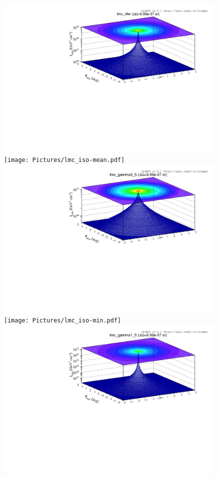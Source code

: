 \documentclass[main.tex]{subfiles}
\begin{document}
\begin{figure}
\centering
{}
\includegraphics[width=1\textwidth]{Pictures/lmc_nfw.pdf}
\endminipage 
{}
\texttt{[image: Pictures/lmc\_iso-mean.pdf]}
\endminipage \\
\includegraphics[width=1\textwidth]{Pictures/lmc_gamma0-5.pdf}
\endminipage
{}
\texttt{[image: Pictures/lmc\_iso-min.pdf]}
\endminipage \\
\includegraphics[width=1\textwidth]{Pictures/lmc_gamma1-5.pdf}

\end{figure}
\end{document}
